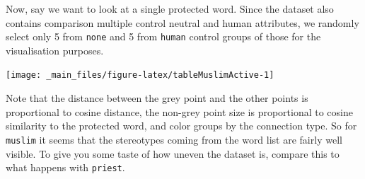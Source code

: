 \documentclass[12pt,]{book}
\newenvironment{Shaded}{\begin{snugshade}}{\end{snugshade}}
\newcommand{\KeywordTok}[1]{\textcolor[rgb]{0.13,0.29,0.53}{\textbf{#1}}}
\newcommand{\DecValTok}[1]{\textcolor[rgb]{0.00,0.00,0.81}{#1}}
\newcommand{\StringTok}[1]{\textcolor[rgb]{0.31,0.60,0.02}{#1}}
\newcommand{\CommentTok}[1]{\textcolor[rgb]{0.56,0.35,0.01}{\textit{#1}}}
\newcommand{\OperatorTok}[1]{\textcolor[rgb]{0.81,0.36,0.00}{\textbf{#1}}}
\newcommand{\NormalTok}[1]{#1}
\begin{document}
Now, say we want to look at a single protected word. Since the dataset
also contains comparison multiple control neutral and human attributes,
we randomly select only 5 from \texttt{none} and 5 from \texttt{human}
control groups of those for the visualisation purposes.

\vspace{1mm} \footnotesize

\begin{Shaded}
\end{Shaded}

\begin{center}\texttt{[image: \_main\_files/figure-latex/tableMuslimActive-1]} \end{center}

\normalsize

Note that the distance between the grey point and the other points is
proportional to cosine distance, the non-grey point size is proportional
to cosine similarity to the protected word, and color groups by the
connection type. So for \texttt{muslim} it seems that the stereotypes
coming from the word list are fairly well visible. To give you some
taste of how uneven the dataset is, compare this to what happens with
\texttt{priest}.
\end{document}
